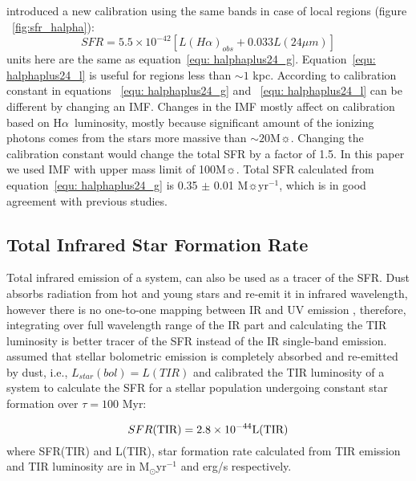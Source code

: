 \documentclass[useAMS,usenatbib]{mn2e}
\newcommand \halpha    {H$\alpha $\ }
\begin{document}
\cite{Calzetti07} introduced a new calibration using the same bands in case of local regions (figure ~\ref{fig:sfr_halpha}):
\begin{equation}
\label{equ: halphaplus24_l}
SFR = 5.5 \times 10^{-42}[L(H{\alpha})_{obs} + 0.033L(24\mu m)]
\end{equation}
units here are the same as equation~\ref{equ: halphaplus24_g}. Equation~\ref{equ: halphaplus24_l} is useful for regions less than $\sim 1$ kpc. According to  \cite{Calzetti07} calibration constant in equations ~\ref{equ: halphaplus24_g} and ~\ref{equ: halphaplus24_l} can be different by changing an IMF. Changes in the IMF mostly affect on calibration based on \halpha luminosity, mostly because significant amount of the ionizing photons comes from the stars more massive than $\sim 20$M$\sun$. Changing the calibration constant would change the total SFR by a factor of 1.5. In this paper we used \cite{Kroupa01} IMF with upper mass limit of 100M$\sun$. Total SFR calculated from equation~\ref{equ: halphaplus24_g} is 0.35 $\pm$ 0.01 M$\sun$yr$^{-1}$, which is in good agreement with previous studies.

\subsection{Total Infrared Star Formation Rate}
\label{sec:sfr_fir}
Total infrared emission of a system, can also be used as a tracer of the SFR. Dust absorbs radiation from hot and young stars and re-emit it in infrared wavelength, however there is no one-to-one mapping between IR and UV emission \citep{Calzetti13}, therefore, integrating over full wavelength range of the IR part and calculating the TIR luminosity is better tracer of the SFR instead of the IR single-band emission. \cite{Calzetti07} assumed that stellar bolometric emission is completely absorbed and re-emitted by dust, i.e., $L_{star}(bol) = L(TIR)$ and calibrated the TIR luminosity of a system to calculate the SFR for a stellar population undergoing constant star formation over $\tau = 100$ Myr:

\begin{equation}
\label{equ:sfr_fir}
SFR(\rm TIR) = 2.8 \times10^{-44}L(\rm TIR)
\end{equation}
where SFR(TIR) and L(TIR), star formation rate calculated from TIR emission and TIR luminosity are in M$_{\odot}$yr$^{-1}$ and erg/s respectively.
\end{document}
